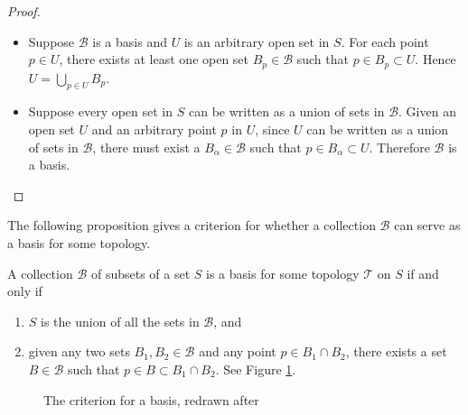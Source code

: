 \begin{proof}\quad

	\begin{itemize}
		\item [$\Longrightarrow$] Suppose $\mathcal{B}$ is a basis and $U$ is
		      an arbitrary open set in $S$. For each point $p\in U$, there exists
		      at least one open set $B_p\in \mathcal{B}$ such that $p\in B_p
			      \subset U$. Hence $U=\bigcup_{p\in U}B_p$.

		\item [$\Longleftarrow$] Suppose every open set in $S$ can be written
		      as a union of sets in $\mathcal{B}$. Given an open set $U$ and an
		      arbitrary point $p$ in $U$, since $U$ can be written as a union of
		      sets in $\mathcal{B}$, there must exist a $B_\alpha\in \mathcal{B}$
		      such that $p\in B_\alpha \subset U$. Therefore $\mathcal{B}$ is a
		      basis.
	\end{itemize}
\end{proof}

The following proposition gives a criterion for whether a collection
$\mathcal{B}$ can serve as a basis for some topology.

\begin{proposition}
  \label{prop:criterion bases}
	A collection $\mathcal{B}$ of subsets of a set $S$ is a basis for some
	topology $\mathcal{T}$ on $S$ if and only if
	\begin{enumerate}
		\item $S$ is the union of all the sets in $\mathcal{B}$, and
		\item given any two sets $B_1, B_2\in\mathcal{B}$ and any point $p\in
			      B_1\cap B_2$, there exists a set $B\in \mathcal{B}$ such that $p\in
			      B\subset B_1\cap B_2$. See Figure \ref{fig:criterion_bases}.
	\end{enumerate}
\end{proposition}

\begin{figure}[htbp]
	\centering
	\caption{The criterion for a basis, redrawn after \cite{tu_introduction_2011}}
	\label{fig:criterion_bases}
\end{figure}




